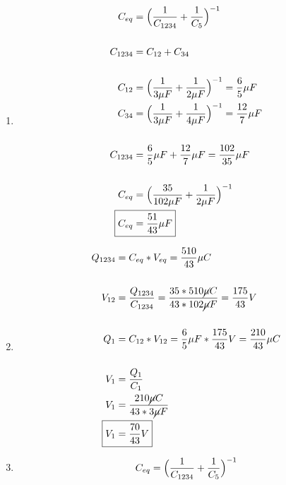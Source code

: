 \documentclass[10pt, twoside]{article}
\begin{document}
	\begin{enumerate}[label=\alph*.]
		\item
			\begin{align*}
				C_{eq} &= \Big{(} \frac{1}{C_{1234}}+ \frac{1}{C_5}  \Big{)}^{-1}\\
				\\
				C_{1234} &= C_{12}+C_{34}\\
				\\
				C_{12} &= \Big{(} \frac{1}{3\mu F} + \frac{1}{2\mu F} \Big{)}^{-1} = \frac{6}{5}\mu F\\
				C_{34} &= \Big{(} \frac{1}{3\mu F} + \frac{1}{4\mu F} \Big{)}^{-1} = \frac{12}{7}\mu F\\
				\\
				C_{1234} &= \frac{6}{5} \mu F + \frac{12}{7} \mu F = \frac{102}{35} \mu F\\
				\\
				C_{eq} &= \Big{(} \frac{35}{102\mu F}+ \frac{1}{2\mu F}  \Big{)}^{-1}\\
				\Aboxed
				{
					C_{eq} &= \frac{51}{43} \mu F
				}
			\end{align*}
		\item
			\begin{align*}
				Q_{1234} &= C_{eq}*V_{eq} = \frac{510}{43} \mu C\\
				\\
				V_{12} &= \frac{Q_{1234}}{C_{1234}}
				= \frac{35*510\cancel{\mu} C}{43*102\cancel{\mu} F}
				=\frac{175}{43}V\\
				\\
				Q_1 &= C_{12}*V_{12}
				= \frac{6}{5} \mu F* \frac{175}{43} V
				= \frac{210}{43} \mu C\\
				\\
				V_1 &= \frac{Q_1}{C_1} \\
				V_1 &= \frac{210\cancel{\mu} C}{43*3\cancel{\mu} F}\\
				\Aboxed
				{
					V_1 &= \frac{70}{43} V
				}
			\end{align*}
	\end{enumerate}
	\noindent\makebox[\linewidth]{\rule{\paperwidth}{0.4pt}}
	\begin{enumerate}[label=\alph*.]
		\setcounter{enumi}{2}
		\item
			\begin{align*}
				C_{eq} &= \Big{(} \frac{1}{C_{1234}}+ \frac{1}{C_5}  \Big{)}^{-1}\\
			\end{align*}
	\end{enumerate}
\end{document}
